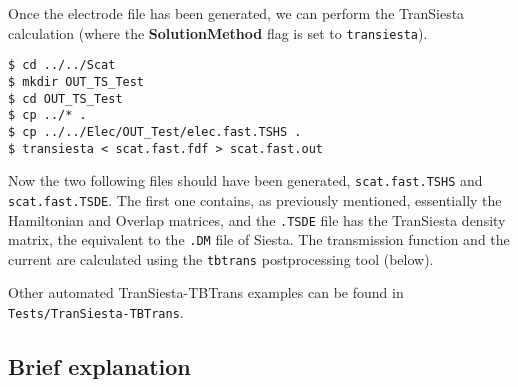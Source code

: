 \documentclass[11pt]{article}
\begin{document}
Once the electrode file has been generated, we can perform the {\sc
  TranSiesta} calculation (where the {\bf SolutionMethod} flag is set
to {\tt transiesta}).

\begin{verbatim}
$ cd ../../Scat
$ mkdir OUT_TS_Test
$ cd OUT_TS_Test
$ cp ../* .
$ cp ../../Elec/OUT_Test/elec.fast.TSHS .
$ transiesta < scat.fast.fdf > scat.fast.out
\end{verbatim}

Now the two following files should have been generated, {\tt scat.fast.TSHS} 
and {\tt scat.fast.TSDE}. The first one contains, as previously mentioned, 
essentially the Hamiltonian and Overlap matrices, and the {\tt .TSDE} file 
has the {\sc TranSiesta} density matrix, the equivalent to the {\tt .DM} 
file of {\sc Siesta}. The transmission function and the current are calculated 
using the {\tt tbtrans} postprocessing tool (below).

Other automated TranSiesta-TBTrans examples can be found in
{\tt Tests/TranSiesta-TBTrans}.

\subsection{Brief explanation}
\end{document}
